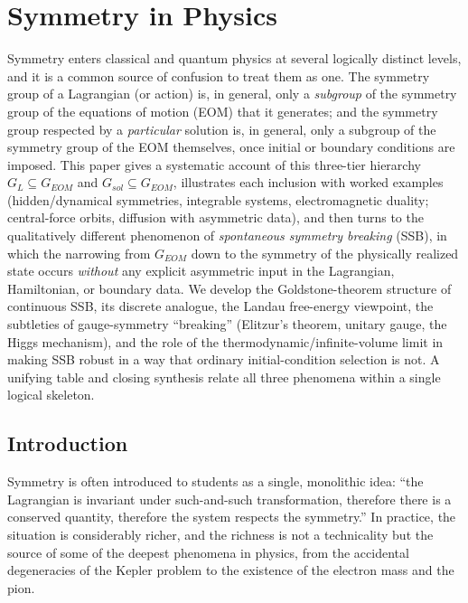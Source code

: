\chapter{Symmetry in Physics}
\label{symmetry}
Symmetry enters classical and quantum physics at several logically distinct
levels, and it is a common source of confusion to treat them as one. The
symmetry group of a Lagrangian (or action) is, in general, only a
\emph{subgroup} of the symmetry group of the equations of motion (EOM) that it
generates; and the symmetry group respected by a \emph{particular} solution is,
in general, only a subgroup of the symmetry group of the EOM themselves, once
initial or boundary conditions are imposed. This paper gives a systematic
account of this three-tier hierarchy $G_L \subseteq G_{EOM}$ and
$G_{sol}\subseteq G_{EOM}$, illustrates each inclusion with worked
examples (hidden/dynamical symmetries, integrable systems, electromagnetic
duality; central-force orbits, diffusion with asymmetric data), and then turns
to the qualitatively different phenomenon of \emph{spontaneous symmetry
breaking} (SSB), in which the narrowing from $G_{EOM}$ down to the symmetry of
the physically realized state occurs \emph{without} any explicit asymmetric
input in the Lagrangian, Hamiltonian, or boundary data. We develop the
Goldstone-theorem structure of continuous SSB, its discrete analogue, the
Landau free-energy viewpoint, the subtleties of gauge-symmetry ``breaking''
(Elitzur's theorem, unitary gauge, the Higgs mechanism), and the role of the
thermodynamic/infinite-volume limit in making SSB robust in a way that ordinary
initial-condition selection is not. A unifying table and closing synthesis
relate all three phenomena within a single logical skeleton.

\section{Introduction}

Symmetry is often introduced to students as a single, monolithic idea: ``the
Lagrangian is invariant under such-and-such transformation, therefore there is
a conserved quantity, therefore the system respects the symmetry.'' In
practice, the situation is considerably richer, and the richness is not a
technicality but the source of some of the deepest phenomena in physics, from
the accidental degeneracies of the Kepler problem to the existence of the
electron mass and the pion.


